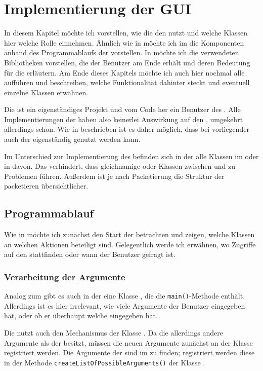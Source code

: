 \chapter{Implementierung der GUI}
In diesem Kapitel möchte ich vorstellen, wie die \mdg den \md nutzt und welche Klassen hier welche Rolle einnehmen. Ähnlich wie in  möchte ich im  die Komponenten anhand des Programmablaufs der \mdg vorstellen. In  möchte ich die verwendeten Bibliotheken vorstellen, die der Benutzer am Ende erhält und deren Bedeutung für die \mdg erläutern. Am Ende dieses Kapitels möchte ich auch hier nochmal alle \packages aufführen und beschreiben, welche Funktionalität dahinter steckt und eventuell einzelne Klassen erwähnen.

Die \mdg ist ein eigenständiges Projekt und vom Code her ein Benutzer des \md. Alle Implementierungen der \mdg haben also keinerlei Auswirkung auf den \md, umgekehrt allerdings schon. Wie in  beschrieben ist es daher möglich, dass bei vorliegender \mdg auch der \md eigenständig genutzt werden kann.

Im Unterschied zur Implementierung des \md befinden sich in der \mdg alle Klassen im \package {} oder in \subpackages davon. Das verhindert, dass gleichnamige \packages oder Klassen zwischen \md und \mdg zu Problemen führen. Außerdem ist je nach Packetierung die Struktur der packetieren \mdg übersichtlicher.

\section{Programmablauf}
Wie in  möchte ich zunächst den Start der \mdg betrachten und zeigen, welche Klassen an welchen Aktionen beteiligt sind. Gelegentlich werde ich erwähnen, wo Zugriffe auf den \md stattfinden oder wann der Benutzer gefragt ist.

\subsection{Verarbeitung der Argumente}
Analog zum \md gibt es auch in der \mdg eine Klasse , die die \texttt{main()}-Methode enthält. Allerdings ist es hier irrelevant, wie viele Argumente der Benutzer eingegeben hat, oder ob er überhaupt welche eingegeben hat.

Die \mdg nutzt auch den Mechanismus der Klasse . Da die \mdg allerdings andere Argumente als der \md besitzt, müssen die neuen Argumente zunächst an der Klasse  registriert werden. Die Argumente der \mdg sind im \package {} zu finden; registriert werden diese in der Methode \texttt{createListOfPossibleArguments()} der Klasse .

